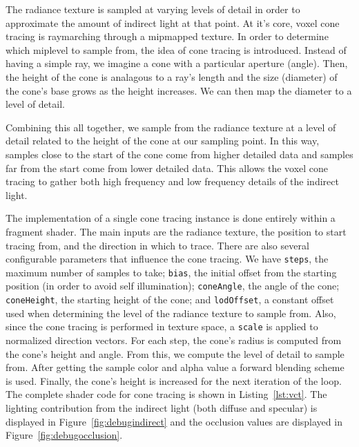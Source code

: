 The radiance texture is sampled at varying levels of detail in order to approximate the amount of indirect light at that point. At it's core, voxel cone tracing is raymarching through a mipmapped texture. In order to determine which miplevel to sample from, the idea of cone tracing is introduced. Instead of having a simple ray, we imagine a cone with a particular aperture (angle). Then, the height of the cone is analagous to a ray's length and the size (diameter) of the cone's base grows as the height increases. We can then map the diameter to a level of detail.

Combining this all together, we sample from the radiance texture at a level of detail related to the height of the cone at our sampling point. In this way, samples close to the start of the cone come from higher detailed data and samples far from the start come from lower detailed data. This allows the voxel cone tracing to gather both high frequency and low frequency details of the indirect light.

The implementation of a single cone tracing instance is done entirely within a fragment shader. The main inputs are the radiance texture, the position to start tracing from, and the direction in which to trace. There are also several configurable parameters that influence the cone tracing. We have \texttt{steps}, the maximum number of samples to take; \texttt{bias}, the initial offset from the starting position (in order to avoid self illumination); \texttt{coneAngle}, the angle of the cone; \texttt{coneHeight}, the starting height of the cone; and \texttt{lodOffset}, a constant offset used when determining the level of the radiance texture to sample from. Also, since the cone tracing is performed in texture space, a \texttt{scale} is applied to normalized direction vectors. For each step, the cone's radius is computed from the cone's height and angle. From this, we compute the level of detail to sample from. After getting the sample color and alpha value a forward blending scheme is used. Finally, the cone's height is increased for the next iteration of the loop. The complete shader code for cone tracing is shown in Listing~\ref{lst:vct}. The lighting contribution from the indirect light (both diffuse and specular) is displayed in Figure~\ref{fig:debugindirect} and the occlusion values are displayed in Figure~\ref{fig:debugocclusion}.

